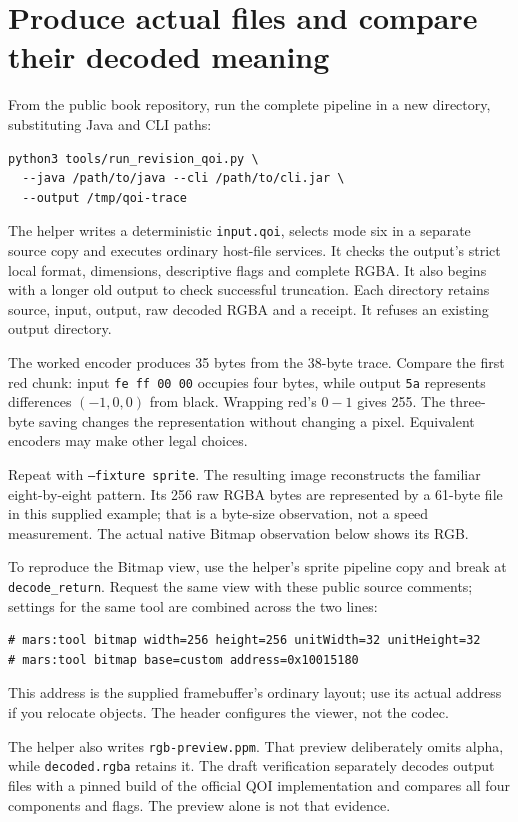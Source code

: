 \section{Produce actual files and compare their decoded meaning}

From the public book repository, run the complete pipeline in a new directory,
substituting Java and CLI paths:
\begin{verbatim}
python3 tools/run_revision_qoi.py \
  --java /path/to/java --cli /path/to/cli.jar \
  --output /tmp/qoi-trace
\end{verbatim}
The helper writes a deterministic \texttt{input.qoi}, selects mode six in a
separate source copy and executes ordinary host-file services. It checks the
output's strict local format, dimensions, descriptive flags and complete RGBA.
It also begins with a longer old output to check successful truncation.
Each directory retains source, input, output, raw decoded RGBA and a receipt.
It refuses an existing output directory.

The worked encoder produces 35 bytes from the 38-byte trace. Compare the first
red chunk: input \texttt{fe ff 00 00} occupies four bytes, while output
\texttt{5a} represents differences $(-1,0,0)$ from black. Wrapping red's
$0-1$ gives 255. The three-byte saving changes the representation without
changing a pixel. Equivalent encoders may make other legal choices.

Repeat with \texttt{--fixture sprite}. The resulting image reconstructs the
familiar eight-by-eight pattern. Its 256 raw RGBA bytes are represented by a
61-byte file in this supplied example; that is a byte-size observation, not a
speed measurement. The actual native Bitmap observation below shows its RGB.

\Needspace{22\baselineskip}


To reproduce the Bitmap view, use the helper's sprite pipeline copy and break
at \texttt{decode\_return}. Request the same view with these public source comments; settings for the same
tool are combined across the two lines:
\begin{verbatim}
# mars:tool bitmap width=256 height=256 unitWidth=32 unitHeight=32
# mars:tool bitmap base=custom address=0x10015180
\end{verbatim}
This address is the supplied framebuffer's ordinary layout; use its actual
address if you relocate objects. The header configures the viewer, not the codec.

The helper also writes \texttt{rgb-preview.ppm}. That preview deliberately omits
alpha, while \texttt{decoded.rgba} retains it. The draft verification separately
decodes output files with a pinned build of the official QOI implementation and
compares all four components and flags. The preview alone is not that evidence.

